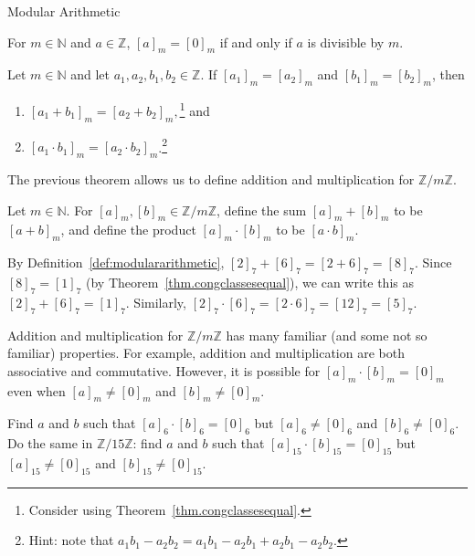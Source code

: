 \begin{section}{Modular Arithmetic}
\begin{theorem}\label{thm.divisibleiffzeromod}
For  $m\in \mathbb{N}$ and $a\in \mathbb{Z}$, $[a]_m = [0]_m$ if and only if $a$ is divisible by $m$.
\end{theorem}

\begin{theorem}
Let $m\in \mathbb{N}$ and let $a_1,a_2,b_1,b_2 \in \mathbb{Z}$. If $[a_1]_m = [a_2]_m$ and $[b_1]_m = [b_2]_m$, then 
\begin{enumerate}[label=\textrm{(\alph*)}]
\item $[a_1+b_1]_m = [a_2+b_2]_m,$\footnote{Consider using Theorem~\ref{thm.congclassesequal}.} and
\item $[a_1\cdot b_1]_m = [a_2\cdot b_2]_m$.\footnote{Hint: note that $a_1b_1-a_2b_2 = a_1b_1 -a_2b_1 + a_2b_1-a_2b_2$.}
\end{enumerate}
\end{theorem}

The previous theorem allows us to define addition and multiplication for $\mathbb{Z}/m\mathbb{Z}$. 

\begin{definition}\label{def:modulararithmetic}
Let $m\in \mathbb{N}$. For $[a]_m, [b]_m \in \mathbb{Z}/m\mathbb{Z}$, define the sum $[a]_m + [b]_m$ to be $[a+b]_m$, and define the product $[a]_m \cdot [b]_m$ to be $ [a\cdot b]_m$.
\end{definition}

\begin{example}
By Definition~\ref{def:modulararithmetic}, $[2]_7+[6]_7 = [2+6]_7 = [8]_7$. Since $[8]_7 = [1]_7$ (by Theorem~\ref{thm.congclassesequal}), we can write this as $[2]_7+[6]_7 = [1]_7$. Similarly, $[2]_7\cdot[6]_7 = [2\cdot6]_7 = [12]_7 = [5]_7$.
\end{example}

Addition and multiplication for $\mathbb{Z}/m\mathbb{Z}$ has many familiar (and some not so familiar) properties. For example, addition and multiplication are both associative and commutative. However, it is possible for $[a]_m\cdot[b]_m = [0]_m$ even when $[a]_m \neq [0]_m$ and $[b]_m \neq [0]_m$.

\begin{problem}
Find $a$ and $b$ such that $[a]_6\cdot[b]_6 = [0]_6$ but $[a]_6 \neq [0]_6$ and $[b]_6 \neq [0]_6$. Do the same in $\mathbb{Z}/15\mathbb{Z}$: find $a$ and $b$ such that $[a]_{15}\cdot[b]_{15} = [0]_{15}$ but $[a]_{15} \neq [0]_{15}$ and $[b]_{15} \neq [0]_{15}$.
\end{problem}


\end{section}
